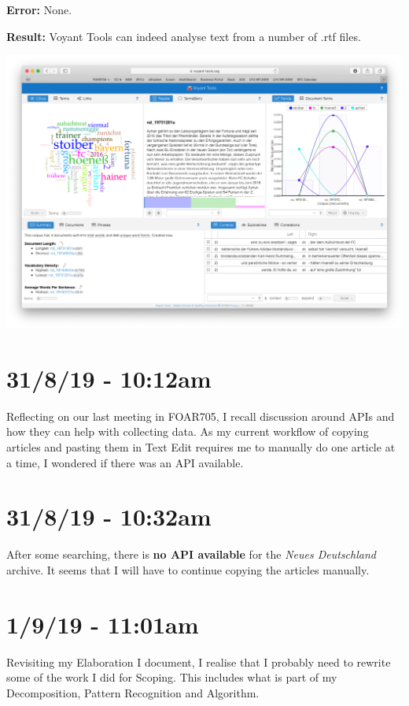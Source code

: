 \documentclass{article}
\begin{document}
\textbf{Error:} None.

\textbf{Result:} Voyant Tools can indeed analyse text from a number of .rtf files.

\includegraphics[width=\textwidth]{voyantresult.png}

\section*{31/8/19 - 10:12am}

Reflecting on our last meeting in FOAR705, I recall discussion around APIs and how they can help with collecting data. As my current workflow of copying articles and pasting them in Text Edit requires me to manually do one article at a time, I wondered if there was an API available.

\section*{31/8/19 - 10:32am}

After some searching, there is \textbf{no API available} for the \textit{Neues Deutschland} archive. It seems that I will have to continue copying the articles manually.

\section*{1/9/19 - 11:01am}

Revisiting my Elaboration I document, I realise that I probably need to rewrite some of the work I did for Scoping. This includes what is part of my Decomposition, Pattern Recognition and Algorithm.
\end{document}
